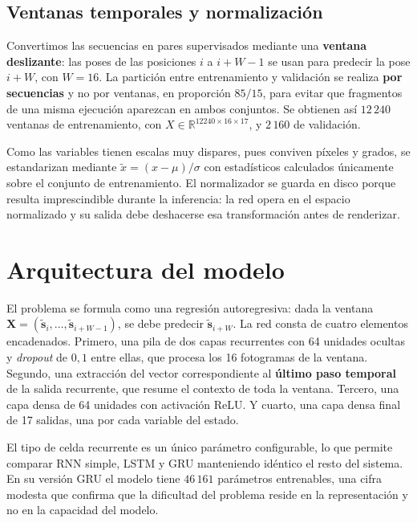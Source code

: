 \documentclass[10pt,twocolumn]{article}
\begin{document}
\subsection{Ventanas temporales y normalización}
Convertimos las secuencias en pares supervisados mediante una \textbf{ventana
deslizante}: las poses de las posiciones $i$ a $i+W-1$ se usan para predecir la
pose $i+W$, con $W=16$. La partición entre entrenamiento y validación se realiza
\textbf{por secuencias} y no por ventanas, en proporción $85/15$, para evitar que
fragmentos de una misma ejecución aparezcan en ambos conjuntos. Se obtienen así
$12\,240$ ventanas de entrenamiento, con
$X\in\mathbb{R}^{12240\times16\times17}$, y $2\,160$ de validación.

Como las variables tienen escalas muy dispares, pues conviven píxeles y grados,
se estandarizan mediante $\tilde{x}=(x-\mu)/\sigma$ con estadísticos calculados
únicamente sobre el conjunto de entrenamiento. El normalizador se guarda en
disco porque resulta imprescindible durante la inferencia: la red opera en el
espacio normalizado y su salida debe deshacerse esa transformación antes de
renderizar.

\section{Arquitectura del modelo}
El problema se formula como una regresión autoregresiva: dada la ventana
$\mathbf{X}=(\tilde{\mathbf{s}}_{i},\dots,\tilde{\mathbf{s}}_{i+W-1})$, se debe
predecir $\tilde{\mathbf{s}}_{i+W}$. La red consta de cuatro elementos
encadenados. Primero, una pila de dos capas recurrentes con 64 unidades ocultas y
\emph{dropout} de $0{,}1$ entre ellas, que procesa los 16 fotogramas de la
ventana. Segundo, una extracción del vector correspondiente al \textbf{último
paso temporal} de la salida recurrente, que resume el contexto de toda la
ventana. Tercero, una capa densa de 64 unidades con activación ReLU. Y cuarto,
una capa densa final de 17 salidas, una por cada variable del estado.

El tipo de celda recurrente es un único parámetro configurable, lo que permite
comparar RNN simple, LSTM y GRU manteniendo idéntico el resto del sistema. En su
versión GRU el modelo tiene $46\,161$ parámetros entrenables, una cifra modesta
que confirma que la dificultad del problema reside en la representación y no en
la capacidad del modelo.
\end{document}
